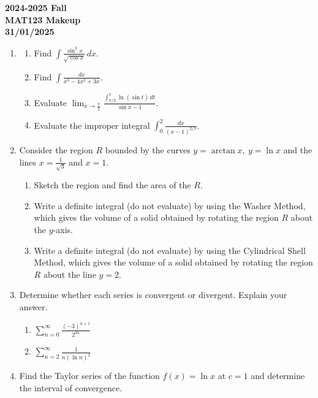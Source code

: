 \documentclass[a4paper, 12pt]{article}
\begin{document}
\pagestyle{empty}

\begin{center}
\textbf{2024-2025 Fall\\MAT123 Makeup\\31/01/2025}
\end{center}

\begin{enumerate}[leftmargin=*,label=\textbf{\arabic*.}]
\item \begin{enumerate}[leftmargin=*,label=\textbf{\alph*.}]
\item Find $\displaystyle\int\frac{\sin^3x}{\sqrt{\cos x}}\,dx$.
\item Find $\displaystyle\int\frac{dx}{x^3-4x^2+3x}$.
\item Evaluate $\displaystyle\lim_{x\to\textstyle\frac\pi2}\frac{\displaystyle\int_{\pi/2}^x\ln(\sin t)\,dt}{\sin x-1}$.
\item Evaluate the improper integral $\displaystyle\int_0^2\frac{dx}{(x-1)^{2/3}}$.
\end{enumerate}

\item Consider the region $R$ bounded by the curves $y=\arctan x,\:y=\ln x$ and the lines $\displaystyle x=\frac1{\sqrt3}$ and $x=1$.

\begin{enumerate}[leftmargin=*,label=\textbf{\alph*.}]
\item Sketch the region and find the area of the $R$. 
\item Write a definite integral (do not evaluate) by using the Washer Method, which gives the volume of a solid obtained by rotating the region $R$ about the $y$-axis.
\item Write a definite integral (do not evaluate) by using the Cylindrical Shell Method, which gives the volume of a solid obtained by rotating the region $R$ about the line $y=2$.
\end{enumerate}

\item Determine whether each series is convergent or divergent. Explain your answer.
\begin{enumerate}[leftmargin=*,label=\textbf{\alph*.}]
\item $\displaystyle\sum_{n=0}^\infty\frac{(-3)^{n+1}}{2^{3n}}$
\item $\displaystyle\sum_{n=2}^\infty\frac1{n(\ln n)^2}$
\end{enumerate}

\item Find the Taylor series of the function $f(x)=\ln x$ at $c=1$ and determine the interval of convergence.

\end{enumerate}
\end{document}
